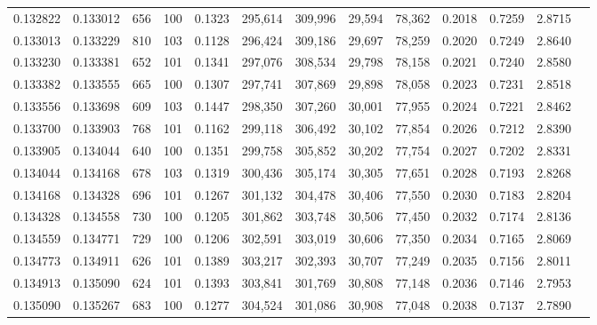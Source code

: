 \begin{tabular}{rrrrrrrrrrrrr}
0.132822 & 0.133012 &   656 & 100 &                                     0.1323 & 295,614 & 309,996 &  29,594 &  78,362 & 0.2018 & 0.7259 & 2.8715 \\
0.133013 & 0.133229 &   810 & 103 &                                     0.1128 & 296,424 & 309,186 &  29,697 &  78,259 & 0.2020 & 0.7249 & 2.8640 \\
0.133230 & 0.133381 &   652 & 101 &                                     0.1341 & 297,076 & 308,534 &  29,798 &  78,158 & 0.2021 & 0.7240 & 2.8580 \\
0.133382 & 0.133555 &   665 & 100 &                                     0.1307 & 297,741 & 307,869 &  29,898 &  78,058 & 0.2023 & 0.7231 & 2.8518 \\
0.133556 & 0.133698 &   609 & 103 &                                     0.1447 & 298,350 & 307,260 &  30,001 &  77,955 & 0.2024 & 0.7221 & 2.8462 \\
0.133700 & 0.133903 &   768 & 101 &                                     0.1162 & 299,118 & 306,492 &  30,102 &  77,854 & 0.2026 & 0.7212 & 2.8390 \\
0.133905 & 0.134044 &   640 & 100 &                                     0.1351 & 299,758 & 305,852 &  30,202 &  77,754 & 0.2027 & 0.7202 & 2.8331 \\
0.134044 & 0.134168 &   678 & 103 &                                     0.1319 & 300,436 & 305,174 &  30,305 &  77,651 & 0.2028 & 0.7193 & 2.8268 \\
0.134168 & 0.134328 &   696 & 101 &                                     0.1267 & 301,132 & 304,478 &  30,406 &  77,550 & 0.2030 & 0.7183 & 2.8204 \\
0.134328 & 0.134558 &   730 & 100 &                                     0.1205 & 301,862 & 303,748 &  30,506 &  77,450 & 0.2032 & 0.7174 & 2.8136 \\
0.134559 & 0.134771 &   729 & 100 &                                     0.1206 & 302,591 & 303,019 &  30,606 &  77,350 & 0.2034 & 0.7165 & 2.8069 \\
0.134773 & 0.134911 &   626 & 101 &                                     0.1389 & 303,217 & 302,393 &  30,707 &  77,249 & 0.2035 & 0.7156 & 2.8011 \\
0.134913 & 0.135090 &   624 & 101 &                                     0.1393 & 303,841 & 301,769 &  30,808 &  77,148 & 0.2036 & 0.7146 & 2.7953 \\
0.135090 & 0.135267 &   683 & 100 &                                     0.1277 & 304,524 & 301,086 &  30,908 &  77,048 & 0.2038 & 0.7137 & 2.7890 \\

\end{tabular}
